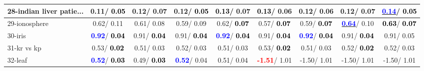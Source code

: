 \begin{table}[h]
\begin{center}
\begin{tabular}{lc|c|c|c|c|c|c|c}
28-indian liver patie... &   0.11/\textcolor{black}{\textbf{  0.05}} &   0.12/  0.07 &   0.12/\textcolor{black}{\textbf{  0.05}} & \textcolor{black}{\textbf{  0.13}}/  0.07 & \textcolor{black}{\textbf{  0.13}}/  0.06 &   0.12/  0.06 &   0.12/  0.07 & \underline{\textcolor{blue}{\textbf{  0.14}}}/\textcolor{black}{\textbf{  0.05}} \\ \hline
29-ionosphere &   0.62/  0.11 &   0.61/  0.08 &   0.59/  0.09 &   0.62/\textcolor{black}{\textbf{  0.07}} &   0.57/\textcolor{black}{\textbf{  0.07}} &   0.59/\textcolor{black}{\textbf{  0.07}} & \underline{\textcolor{blue}{\textbf{  0.64}}}/  0.10 & \textcolor{black}{\textbf{  0.63}}/\textcolor{black}{\textbf{  0.07}} \\
30-iris & \textcolor{blue}{\textbf{  0.92}}/\textcolor{black}{\textbf{  0.04}} &   0.91/\textcolor{black}{\textbf{  0.04}} &   0.91/\textcolor{black}{\textbf{  0.04}} & \textcolor{blue}{\textbf{  0.92}}/\textcolor{black}{\textbf{  0.04}} &   0.91/\textcolor{black}{\textbf{  0.04}} & \textcolor{blue}{\textbf{  0.92}}/\textcolor{black}{\textbf{  0.04}} &   0.91/\textcolor{black}{\textbf{  0.04}} &   0.91/  0.05 \\
31-kr vs kp &   0.53/\textcolor{black}{\textbf{  0.02}} &   0.51/  0.03 &   0.52/  0.03 &   0.51/  0.03 &   0.53/\textcolor{black}{\textbf{  0.02}} &   0.51/  0.03 &   0.52/\textcolor{black}{\textbf{  0.02}} &   0.52/  0.03 \\
32-leaf & \textcolor{blue}{\textbf{  0.52}}/\textcolor{black}{\textbf{  0.03}} &   0.49/\textcolor{black}{\textbf{  0.03}} & \textcolor{blue}{\textbf{  0.52}}/  0.04 &   0.51/  0.04 & \textcolor{red}{\textbf{ -1.51}}/  1.01 &  -1.50/  1.01 &  -1.50/  1.01 &  -1.50/  1.01 \\\end{tabular}\label{stratsALCKappa0b5NN}
\end{center}
\end{table}
